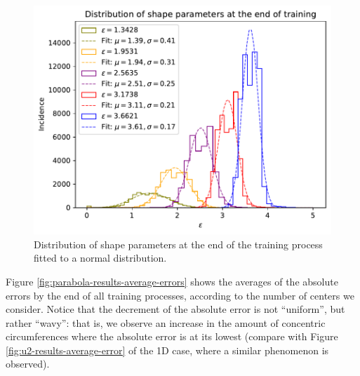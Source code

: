 \documentclass[12pt]{report} %
\begin{document}
\begin{figure}[h]
  \includegraphics[width=.8\textwidth]{imagenes/experiments/2d/statistical_2d_full_scheduler_interpolation/parabola/distribution_of_shape_parameters_at_end_of_training.pdf}
  \caption{Distribution of shape parameters at the end of the training process fitted to a normal distribution.}
  \label{fig:parabola-results-shape-parameters}
\end{figure}

Figure \ref{fig:parabola-results-average-errors} shows the averages of the absolute errors by the end of all training processes, according to the number of centers we consider. Notice that the decrement of the absolute error is not ``uniform'', but rather ``wavy'': that is, we observe an increase in the amount of concentric circumferences where the absolute error is at its lowest (compare with Figure \ref{fig:u2-results-average-error} of the 1D case, where a similar phenomenon is observed).
\end{document}
